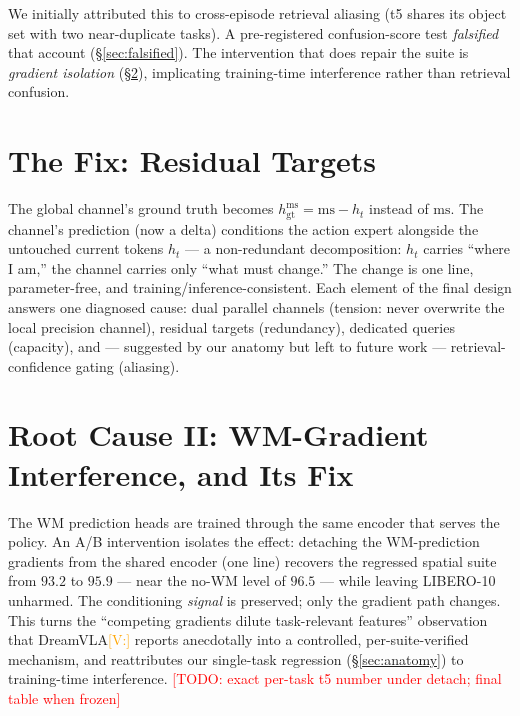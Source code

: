 \documentclass[conference]{IEEEtran}
\newcommand{\todo}[1]{\textcolor{red}{[TODO: #1]}}
\newcommand{\verify}[1]{\textcolor{orange}{[V:#1]}}
\begin{document}
We initially attributed this to cross-episode retrieval aliasing (t5
shares its object set with two near-duplicate tasks). A pre-registered
confusion-score test \emph{falsified} that account
(\S\ref{sec:falsified}). The intervention that does repair the suite is
\emph{gradient isolation} (\S\ref{sec:grad}), implicating training-time
interference rather than retrieval confusion.

\section{The Fix: Residual Targets}\label{sec:fix}
The global channel's ground truth becomes
$h^{\mathrm{ms}}_{\mathrm{gt}} = \mathrm{ms} - h_t$
instead of $\mathrm{ms}$. The channel's prediction (now a delta)
conditions the action expert alongside the untouched current tokens
$h_t$ --- a non-redundant decomposition: $h_t$ carries ``where I am,''
the channel carries only ``what must change.'' The change is one line,
parameter-free, and training/inference-consistent. Each element of the
final design answers one diagnosed cause: dual parallel channels
(tension: never overwrite the local precision channel), residual
targets (redundancy), dedicated queries (capacity), and --- suggested
by our anatomy but left to future work --- retrieval-confidence gating
(aliasing).

\section{Root Cause II: WM-Gradient Interference, and Its Fix}
\label{sec:grad}
The WM prediction heads are trained through the same encoder that
serves the policy. An A/B intervention isolates the effect: detaching
the WM-prediction gradients from the shared encoder (one line) recovers
the regressed spatial suite from $93.2$ to $95.9$ --- near the no-WM
level of $96.5$ --- while leaving LIBERO-10 unharmed. The conditioning
\emph{signal} is preserved; only the gradient path changes. This turns
the ``competing gradients dilute task-relevant features'' observation
that DreamVLA\verify{} reports anecdotally into a controlled,
per-suite-verified mechanism, and reattributes our single-task
regression (\S\ref{sec:anatomy}) to training-time interference.
\todo{exact per-task t5 number under detach; final table when frozen}
\end{document}
